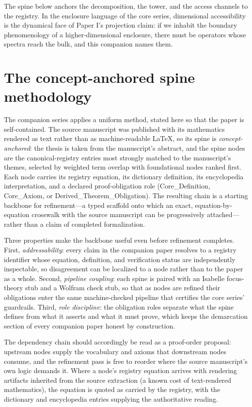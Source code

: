 \documentclass[11pt]{article}
\theoremstyle{remark}
\begin{document}
The spine below anchors the decomposition, the tower, and the access channels to the registry. In the enclosure language of the core series, dimensional accessibility is the dynamical face of Paper I's projection claim: if we inhabit the boundary phenomenology of a higher-dimensional enclosure, there must be operators whose spectra reach the bulk, and this companion names them.

\section{The concept-anchored spine methodology}
\label{sec:method}

The companion series applies a uniform method, stated here so that the paper is self-contained. The source manuscript was published with its mathematics rendered as text rather than as machine-readable LaTeX, so its spine is \emph{concept-anchored}: the thesis is taken from the manuscript's abstract, and the spine nodes are the canonical-registry entries most strongly matched to the manuscript's themes, selected by weighted term overlap with foundational nodes ranked first. Each node carries its registry equation, its dictionary definition, its encyclopedia interpretation, and a declared proof-obligation role (Core\_Definition, Core\_Axiom, or Derived\_Theorem\_Obligation). The resulting chain is a starting backbone for refinement---a typed scaffold onto which an exact, equation-by-equation crosswalk with the source manuscript can be progressively attached---rather than a claim of completed formalization.

Three properties make the backbone useful even before refinement completes. First, \emph{addressability}: every claim in the companion paper resolves to a registry identifier whose equation, definition, and verification status are independently inspectable, so disagreement can be localized to a node rather than to the paper as a whole. Second, \emph{pipeline coupling}: each spine is paired with an Isabelle focus-theory stub and a Wolfram check stub, so that as nodes are refined their obligations enter the same machine-checked pipeline that certifies the core series' guardrails. Third, \emph{role discipline}: the obligation roles separate what the spine defines from what it asserts and what it must prove, which keeps the demarcation section of every companion paper honest by construction.

The dependency chain should accordingly be read as a proof-order proposal: upstream nodes supply the vocabulary and axioms that downstream nodes consume, and the refinement pass is free to reorder where the source manuscript's own logic demands it. Where a node's registry equation arrives with rendering artifacts inherited from the source extraction (a known cost of text-rendered mathematics), the equation is quoted as carried by the registry, with the dictionary and encyclopedia entries supplying the authoritative reading.
\end{document}
